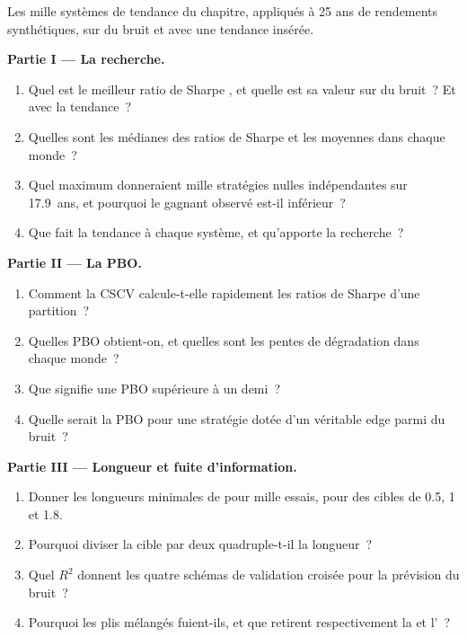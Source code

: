 \begin{problem}\label{pb:rs:overfitting:1}
Les mille systèmes de tendance du chapitre, appliqués à 25 ans de rendements synthétiques, sur du bruit et avec une tendance insérée.

\medskip\noindent\textbf{Partie I --- La recherche.}
\begin{enumerate}
\item Quel est le meilleur ratio de Sharpe , et quelle est sa valeur  sur du bruit~? Et avec la tendance~?
\item Quelles sont les médianes des ratios de Sharpe  et les moyennes  dans chaque monde~?
\item Quel maximum donneraient mille stratégies nulles indépendantes sur 17.9~ans, et pourquoi le gagnant observé est-il inférieur~?
\item Que fait la tendance à chaque système, et qu'apporte la recherche~?
\end{enumerate}

\medskip\noindent\textbf{Partie II --- La PBO.}
\begin{enumerate}[resume]
\item Comment la CSCV calcule-t-elle rapidement les ratios de Sharpe d'une partition~?
\item Quelles PBO obtient-on, et quelles sont les pentes de dégradation dans chaque monde~?
\item Que signifie une PBO supérieure à un demi~?
\item Quelle serait la PBO pour une stratégie dotée d'un véritable edge parmi du bruit~?
\end{enumerate}

\medskip\noindent\textbf{Partie III --- Longueur et fuite d'information.}
\begin{enumerate}[resume]
\item Donner les longueurs minimales de  pour mille essais, pour des cibles de 0.5, 1 et 1.8.
\item Pourquoi diviser la cible par deux quadruple-t-il la longueur~?
\item Quel $R^2$ donnent les quatre schémas de validation croisée pour la prévision du bruit~?
\item Pourquoi les plis mélangés fuient-ils, et que retirent respectivement la  et l'~?
\end{enumerate}


\end{problem}

